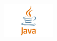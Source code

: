 \documentclass[letterpaper,11pt]{exam}
\begin{document}
\begin{figure}[b]\label{end}
	\center
	\includegraphics[width=1in]{java}
\end{figure}
\end{document}
